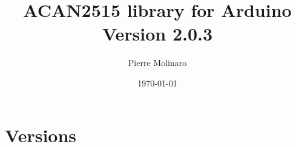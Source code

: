 \documentclass[9pt, a4paper, obeyspaces]{extarticle}
\begin{document}
 


\title{\bf \Huge{ACAN2515 library for Arduino\\Version 2.0.3}}
\author{Pierre Molinaro}
\date {\today}

\maketitle


\tableofcontents


\newpage
\section{Versions}
\end{document}
